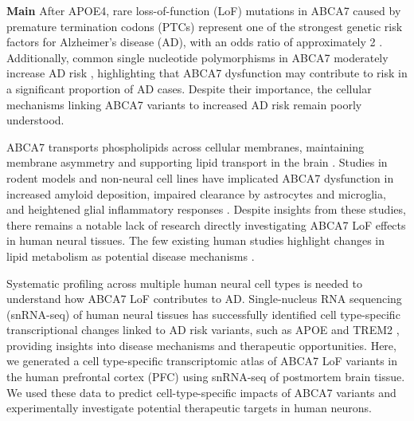 \textbf{Main}\newline\newline
After APOE4, rare loss-of-function (LoF) mutations in ABCA7 caused by premature termination codons (PTCs) represent one of the strongest genetic risk factors for Alzheimer’s disease (AD), with an odds ratio of approximately 2 \supercite{Steinberg2015-mu,Holstege2022-vp}. Additionally, common single nucleotide polymorphisms in ABCA7 moderately increase AD risk \supercite{Holstege2022-vp,Kunkle2019-yo}, highlighting that ABCA7 dysfunction may contribute to risk in a significant proportion of AD cases. Despite their importance, the cellular mechanisms linking ABCA7 variants to increased AD risk remain poorly understood.

ABCA7 transports phospholipids across cellular membranes, maintaining membrane asymmetry and supporting lipid transport in the brain \supercite{Abe-Dohmae2004-wb,Wang2003-wh,Tomioka2017-nv,Picataggi2022-yp,Quazi2013-pe,Fang2025,Le2023-on}. Studies in rodent models and non-neural cell lines have implicated ABCA7 dysfunction in increased amyloid deposition, impaired clearance by astrocytes and microglia, and heightened glial inflammatory responses \supercite{Satoh2015-yu,Chan2008-qu,Kim2013-sv,Fu2016-qe,Aikawa2019-hv,Aikawa2021-vz}. Despite insights from these studies, there remains a notable lack of research directly investigating ABCA7 LoF effects in human neural tissues. The few existing human studies highlight changes in lipid metabolism as potential disease mechanisms \supercite{Kawatani2023-vf,Liu2021-zh,Duchateau2024-rf}.

Systematic profiling across multiple human neural cell types is needed to understand how ABCA7 LoF contributes to AD. Single-nucleus RNA sequencing (snRNA-seq) of human neural tissues has successfully identified cell type-specific transcriptional changes linked to AD risk variants, such as APOE and TREM2 \supercite{Brase2023-xk,Blanchard2022-cf,Sayed2021-qn}, providing insights into disease mechanisms and therapeutic opportunities. Here, we generated a cell type-specific transcriptomic atlas of ABCA7 LoF variants in the human prefrontal cortex (PFC) using snRNA-seq of postmortem brain tissue. We used these data to predict cell-type-specific impacts of ABCA7 variants and experimentally investigate potential therapeutic targets in human neurons.
